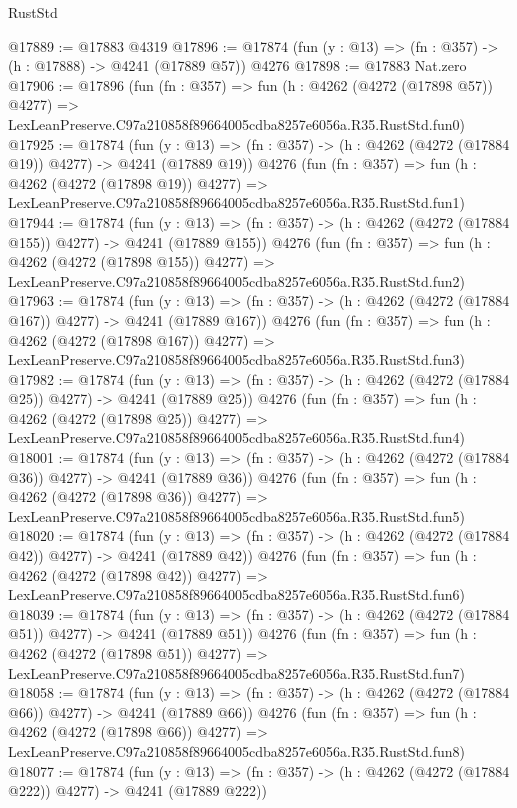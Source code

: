 \begin{lexlean}{RustStd}
\begin{coremodule}
@17889 := @17883 @4319
@17896 := @17874 (fun (y : @13) => (fn : @357) -> (h : @17888) -> @4241 (@17889 @57)) @4276
@17898 := @17883 Nat.zero
@17906 := @17896
    (fun (fn : @357) =>
    fun (h : @4262 (@4272 (@17898 @57)) @4277) =>
    LexLeanPreserve.C97a210858f89664005cdba8257e6056a.R35.RustStd.fun0)
@17925 := @17874
    (fun (y : @13) => (fn : @357) -> (h : @4262 (@4272 (@17884 @19)) @4277) -> @4241 (@17889 @19))
    @4276
    (fun (fn : @357) =>
    fun (h : @4262 (@4272 (@17898 @19)) @4277) =>
    LexLeanPreserve.C97a210858f89664005cdba8257e6056a.R35.RustStd.fun1)
@17944 := @17874
    (fun (y : @13) => (fn : @357) -> (h : @4262 (@4272 (@17884 @155)) @4277) -> @4241 (@17889 @155))
    @4276
    (fun (fn : @357) =>
    fun (h : @4262 (@4272 (@17898 @155)) @4277) =>
    LexLeanPreserve.C97a210858f89664005cdba8257e6056a.R35.RustStd.fun2)
@17963 := @17874
    (fun (y : @13) => (fn : @357) -> (h : @4262 (@4272 (@17884 @167)) @4277) -> @4241 (@17889 @167))
    @4276
    (fun (fn : @357) =>
    fun (h : @4262 (@4272 (@17898 @167)) @4277) =>
    LexLeanPreserve.C97a210858f89664005cdba8257e6056a.R35.RustStd.fun3)
@17982 := @17874
    (fun (y : @13) => (fn : @357) -> (h : @4262 (@4272 (@17884 @25)) @4277) -> @4241 (@17889 @25))
    @4276
    (fun (fn : @357) =>
    fun (h : @4262 (@4272 (@17898 @25)) @4277) =>
    LexLeanPreserve.C97a210858f89664005cdba8257e6056a.R35.RustStd.fun4)
@18001 := @17874
    (fun (y : @13) => (fn : @357) -> (h : @4262 (@4272 (@17884 @36)) @4277) -> @4241 (@17889 @36))
    @4276
    (fun (fn : @357) =>
    fun (h : @4262 (@4272 (@17898 @36)) @4277) =>
    LexLeanPreserve.C97a210858f89664005cdba8257e6056a.R35.RustStd.fun5)
@18020 := @17874
    (fun (y : @13) => (fn : @357) -> (h : @4262 (@4272 (@17884 @42)) @4277) -> @4241 (@17889 @42))
    @4276
    (fun (fn : @357) =>
    fun (h : @4262 (@4272 (@17898 @42)) @4277) =>
    LexLeanPreserve.C97a210858f89664005cdba8257e6056a.R35.RustStd.fun6)
@18039 := @17874
    (fun (y : @13) => (fn : @357) -> (h : @4262 (@4272 (@17884 @51)) @4277) -> @4241 (@17889 @51))
    @4276
    (fun (fn : @357) =>
    fun (h : @4262 (@4272 (@17898 @51)) @4277) =>
    LexLeanPreserve.C97a210858f89664005cdba8257e6056a.R35.RustStd.fun7)
@18058 := @17874
    (fun (y : @13) => (fn : @357) -> (h : @4262 (@4272 (@17884 @66)) @4277) -> @4241 (@17889 @66))
    @4276
    (fun (fn : @357) =>
    fun (h : @4262 (@4272 (@17898 @66)) @4277) =>
    LexLeanPreserve.C97a210858f89664005cdba8257e6056a.R35.RustStd.fun8)
@18077 := @17874
    (fun (y : @13) => (fn : @357) -> (h : @4262 (@4272 (@17884 @222)) @4277) -> @4241 (@17889 @222))

\end{coremodule}
\end{lexlean}
